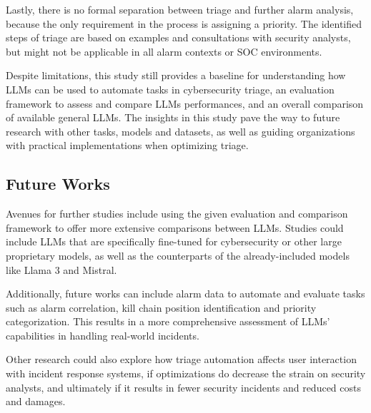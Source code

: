 Lastly, there is no formal separation between triage and further alarm analysis, because the only requirement in the
process is assigning a priority.
The identified steps of triage are based on examples and consultations with security analysts, but might not be
applicable in all alarm contexts or SOC environments.

Despite limitations, this study still provides a baseline for understanding how LLMs can be used to automate tasks in
cybersecurity triage, an evaluation framework to assess and compare LLMs performances, and an overall comparison of
available general LLMs.
The insights in this study pave the way to future research with other tasks, models and datasets, as well as guiding
organizations with practical implementations when optimizing triage.

\subsection{Future Works}
\label{subsec:future-works}

Avenues for further studies include using the given evaluation and comparison framework to offer more extensive
comparisons between LLMs.
Studies could include LLMs that are specifically fine-tuned for cybersecurity or other large proprietary models, as
well as the counterparts of the already-included models like Llama 3 and Mistral.

Additionally, future works can include alarm data to automate and evaluate tasks such as alarm correlation, kill
chain position identification and priority categorization.
This results in a more comprehensive assessment of LLMs' capabilities in handling real-world incidents.

Other research could also explore how triage automation affects user interaction with incident response systems, if
optimizations do decrease the strain on security analysts, and ultimately if it results in fewer security incidents and
reduced costs and damages.